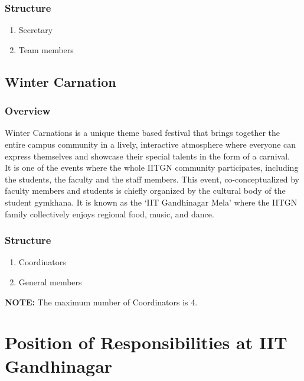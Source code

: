 \documentclass[12pt]{article}
\begin{document}
\subsubsection{Structure}
\begin{enumerate}
    \item Secretary
    \item Team members
\end{enumerate}


\subsection{Winter Carnation}
\subsubsection{Overview}
Winter Carnations is a unique theme based festival that brings together the entire campus community in a lively, interactive atmosphere where everyone can express themselves and showcase their special talents in the form of a carnival. \\

\noindent It is one of the events where the whole IITGN community participates, including the students, the faculty and the staff members. This event, co-conceptualized by faculty members and students is chiefly organized by the cultural body of the student gymkhana. It is known as the ‘IIT Gandhinagar Mela’ where the IITGN family collectively enjoys regional food, music, and dance.

\subsubsection{Structure}
\begin{enumerate}
    \item Coordinators
    \item General members
\end{enumerate}
\textbf{NOTE:} The maximum number of Coordinators is 4.


\newpage
\section{Position of Responsibilities at IIT Gandhinagar}
\end{document}
